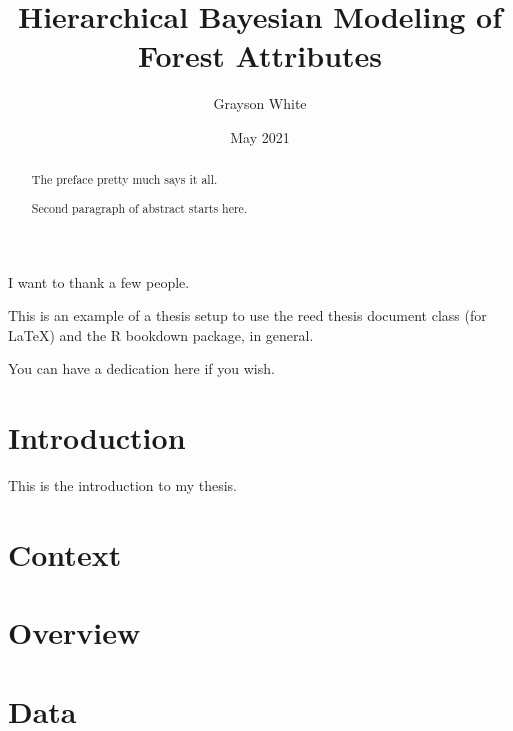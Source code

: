 \documentclass[12pt,twoside]{reedthesis}
\title{Hierarchical Bayesian Modeling of Forest Attributes}
\author{Grayson White}
\date{May 2021}
\begin{document}
  \maketitle

\frontmatter %
\pagestyle{empty} %
  \begin{acknowledgements}
    I want to thank a few people.
  \end{acknowledgements}
  \begin{preface}
    This is an example of a thesis setup to use the reed thesis document class
    (for LaTeX) and the R bookdown package, in general.
  \end{preface}
  \hypersetup{linkcolor=black}
  \setcounter{tocdepth}{2}
  \tableofcontents

  \listoftables

  \listoffigures
  \begin{abstract}
    The preface pretty much says it all.
    
    \par
    
    Second paragraph of abstract starts here.
  \end{abstract}
  \begin{dedication}
    You can have a dedication here if you wish.
  \end{dedication}
\mainmatter %
\pagestyle{fancyplain} %

\hypertarget{introduction}{%
\chapter*{Introduction}\label{introduction}}

This is the introduction to my thesis.

\hypertarget{context}{%
\chapter{Context}\label{context}}

\hypertarget{overview}{%
\chapter{Overview}\label{overview}}

\hypertarget{data}{%
\chapter{Data}\label{data}}
\end{document}
